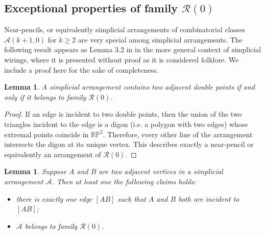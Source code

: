 \documentclass[a4paper,11pt,reqno]{amsart}
\newtheorem{lem}[thm]{Lemma}
\theoremstyle{definition}
\theoremstyle{remark}
\theoremstyle{definition}
\theoremstyle{definition}
\theoremstyle{definition}
\numberwithin{equation}{section}
\begin{document}



\subsection{Exceptional properties of family $\mathcal{R}(0)$}

Near-pencils, or equivalently simplicial arrangements of combinatorial classes $\mathcal{A}(k+1,0)$ for $k \geq 2$ are very special among simplicial arrangements. The following result appears as Lemma 3.2 in \cite{Cu1} in the more general context of simplicial wirings, where it is presented without proof as it is considered folklore. We include a proof here for the sake of completeness.

\begin{lem}\label{lem:adjaDP}
A simplicial arrangement contains two adjacent double points if and only if it belongs to family $\mathcal{R}(0)$.
\end{lem}

\begin{proof}
If an edge is incident to two double points, then the union of the two triangles incident to the edge is a digon (i.e. a polygon with two edges) whose extremal points coincide in $\mathbb{RP}^{2}$. Therefore, every other line of the arrangement intersects the digon at its unique vertex. This describes exactly a near-pencil or equivalently an arrangement of $\mathcal{R}(0)$.
\end{proof}

\begin{lem}\label{lem:R0edge} Suppose $A$ and $B$ are two adjacent vertices in a simplicial arrangement $\mathcal{A}$. Then at least one the following claims holds:
\begin{itemize}
\item there is exactly one edge $[AB]$ such that $A$ and $B$ both are incident to $[AB]$;
\item $\mathcal{A}$ belongs to family $\mathcal{R}(0)$.
\end{itemize}
\end{lem}
\end{document}
